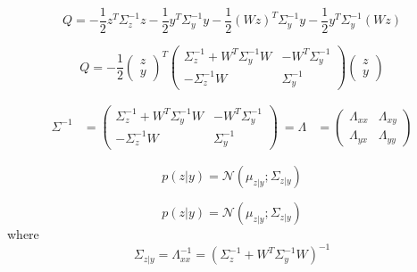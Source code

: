 \begin{equation}
Q = -\frac{1}{2}z^T\Sigma_z^{-1}z - \frac{1}{2}y^T\Sigma_y^{-1}y - \frac{1}{2}(Wz)^T\Sigma_y^{-1}y - \frac{1}{2}y^T\Sigma_y^{-1}(Wz) 
\end{equation}

\raggedright {}
\begin{equation}
Q = -\frac{1}{2}\begin{pmatrix} z \\ y \end{pmatrix}^T \begin{pmatrix} \Sigma_z^{-1} + W^T\Sigma_y^{-1}W & -W^T\Sigma_y^{-1} \\   -\Sigma_z^{-1}W  & \Sigma_y^{-1} \end{pmatrix} \begin{pmatrix} z \\ y \end{pmatrix} 
\end{equation}

\raggedright {}
\begin{equation}
\begin{aligned}
\Sigma^{-1} &= \begin{pmatrix} \Sigma_z^{-1} + W^T\Sigma_y^{-1}W & -W^T\Sigma_y^{-1} \\   -\Sigma_z^{-1}W  & \Sigma_y^{-1} \end{pmatrix} \
= \Lambda &= \begin{pmatrix} \Lambda_{xx} & \Lambda_{xy} \\ \Lambda_{yx} & \Lambda_{yy} \end{pmatrix}
\end{aligned}
\end{equation}
\raggedright {}
\begin{equation}
p(z|y) = \mathcal{N}(\mu_{z|y}; \Sigma_{z|y})
\end{equation}
\raggedright {}
\begin{equation}
p(z|y) = \mathcal{N}(\mu_{z|y}; \Sigma_{z|y}) 
\end{equation}
where
\begin{equation}
\Sigma_{z|y} =  \Lambda_{xx}^{-1} = (\Sigma_z^{-1} + W^T\Sigma_y^{-1}W)^{-1}
\end{equation}


